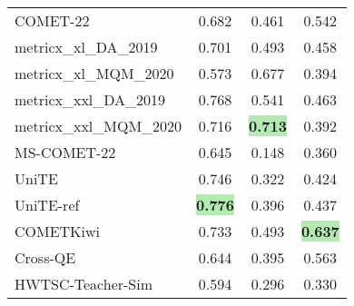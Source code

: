 \documentclass[11pt]{article}
\begin{document}
\begin{table}[t]
\begin{tabular}{@{}lccc@{}}
\midrule
COMET-22                & \phantom{-}0.682                                          & \phantom{-}0.461                                              & \phantom{-}0.542                                      \\
metricx\_xl\_DA\_2019   & \phantom{-}0.701                                          & \phantom{-}0.493                                              & \phantom{-}0.458                                      \\
metricx\_xl\_MQM\_2020  & \phantom{-}0.573                                          & \phantom{-}0.677                                              & \phantom{-}0.394                                      \\
metricx\_xxl\_DA\_2019  & \phantom{-}0.768                                          & \phantom{-}0.541                                              & \phantom{-}0.463                                      \\
metricx\_xxl\_MQM\_2020 & \phantom{-}0.716                                          & \colorbox[HTML]{B2EAB1}{\textbf{\phantom{-}0.713}}                                              & \phantom{-}0.392                                      \\
MS-COMET-22             & \phantom{-}0.645                                          & \phantom{-}0.148                                              & \phantom{-}0.360                                      \\
UniTE                   & \phantom{-}0.746                                          & \phantom{-}0.322                                              & \phantom{-}0.424                                      \\
UniTE-ref               & \colorbox[HTML]{B2EAB1}{\textbf{\phantom{-}0.776}}                                          & \phantom{-}0.396                                              & \phantom{-}0.437                                      \\
\midrule
COMETKiwi               & \phantom{-}0.733                                          & \phantom{-}0.493                                              & \colorbox[HTML]{B2EAB1}{\textbf{\phantom{-}0.637}}                                      \\
Cross-QE                & \phantom{-}0.644                                          & \phantom{-}0.395                                              & \phantom{-}0.563                                      \\
HWTSC-Teacher-Sim       & \phantom{-}0.594                                          & \phantom{-}0.296                                              & \phantom{-}0.330                                      \\

\end{tabular}
\end{table}
\end{document}
